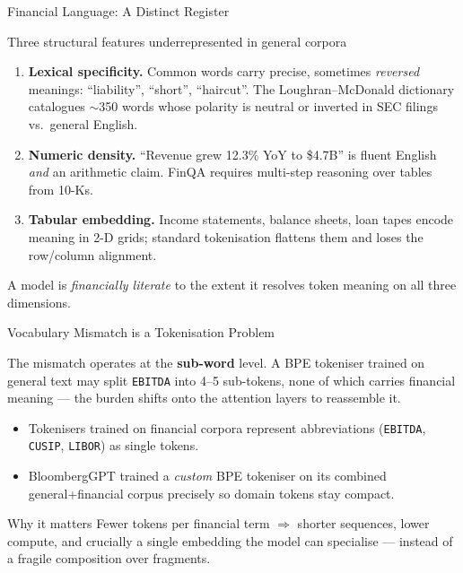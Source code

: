 \documentclass[9pt,t]{beamer}
\begin{document}
\begin{frame}{Financial Language: A Distinct Register}
\begin{block}{Three structural features underrepresented in general corpora}
\begin{enumerate}
  \item \textbf{Lexical specificity.} Common words carry precise, sometimes
        \emph{reversed} meanings: ``liability'', ``short'', ``haircut''. The
        Loughran--McDonald dictionary catalogues $\sim$350 words whose polarity
        is neutral or inverted in SEC filings vs.\ general English.
  \item \textbf{Numeric density.} ``Revenue grew 12.3\% YoY to \$4.7B'' is fluent
        English \emph{and} an arithmetic claim. FinQA requires multi-step
        reasoning over tables from 10-Ks.
  \item \textbf{Tabular embedding.} Income statements, balance sheets, loan tapes
        encode meaning in 2-D grids; standard tokenisation flattens them and loses
        the row/column alignment.
\end{enumerate}
\end{block}
A model is \emph{financially literate} to the extent it resolves token meaning on
all three dimensions.
\end{frame}

\begin{frame}{Vocabulary Mismatch is a Tokenisation Problem}
\begin{underhood}
The mismatch operates at the \textbf{sub-word} level. A BPE tokeniser trained on
general text may split \texttt{EBITDA} into 4--5 sub-tokens, none of which carries
financial meaning --- the burden shifts onto the attention layers to reassemble it.
\end{underhood}

\medskip
\begin{itemize}
  \item Tokenisers trained on financial corpora represent abbreviations
        (\texttt{EBITDA}, \texttt{CUSIP}, \texttt{LIBOR}) as single tokens.
  \item BloombergGPT trained a \emph{custom} BPE tokeniser on its combined
        general+financial corpus precisely so domain tokens stay compact.
\end{itemize}

\medskip
\begin{exampleblock}{Why it matters}
Fewer tokens per financial term $\Rightarrow$ shorter sequences, lower compute,
and crucially a single embedding the model can specialise --- instead of a
fragile composition over fragments.
\end{exampleblock}
\end{frame}
\end{document}
